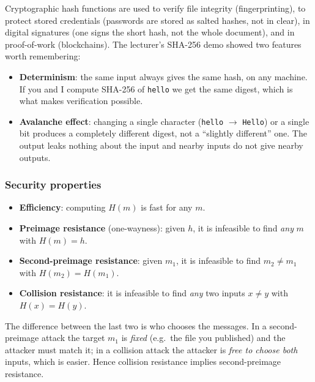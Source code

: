 Cryptographic hash functions are used to verify file integrity (fingerprinting), to protect stored credentials (passwords are stored as salted hashes, not in clear), in digital signatures (one signs the short hash, not the whole document), and in proof-of-work (blockchains). The lecturer's SHA-256 demo showed two features worth remembering:
\begin{itemize}
    \item \textbf{Determinism}: the same input always gives the same hash, on any machine. If you and I compute SHA-256 of \texttt{hello} we get the same digest, which is what makes verification possible.
    \item \textbf{Avalanche effect}: changing a single character (\texttt{hello} $\to$ \texttt{Hello}) or a single bit produces a completely different digest, not a \enquote{slightly different} one. The output leaks nothing about the input and nearby inputs do not give nearby outputs.
\end{itemize}

\subsubsection{Security properties}

\begin{definition}
\label{def:hash-properties}
\leavevmode
\begin{itemize}
    \item \textbf{Efficiency}: computing $H(m)$ is fast for any $m$.
    \item \textbf{Preimage resistance} (one-wayness): given $h$, it is infeasible to find \emph{any} $m$ with $H(m) = h$.
    \item \textbf{Second-preimage resistance}: given $m_1$, it is infeasible to find $m_2 \neq m_1$ with $H(m_2) = H(m_1)$.
    \item \textbf{Collision resistance}: it is infeasible to find \emph{any} two inputs $x \neq y$ with $H(x) = H(y)$.
\end{itemize}
\end{definition}

The difference between the last two is who chooses the messages. In a second-preimage attack the target $m_1$ is \emph{fixed} (e.g.\ the file you published) and the attacker must match it; in a collision attack the attacker is \emph{free to choose both} inputs, which is easier. Hence collision resistance implies second-preimage resistance.

